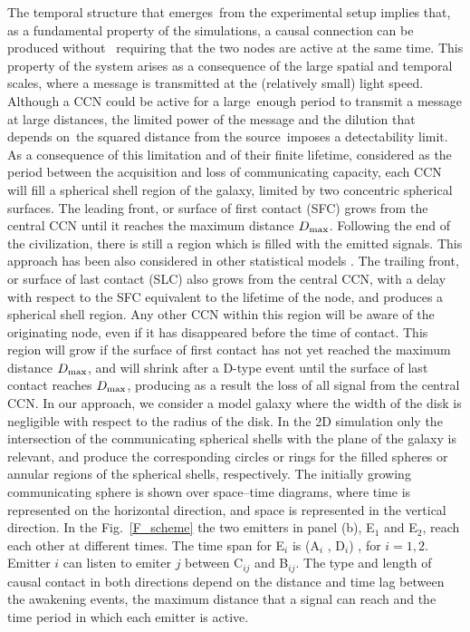 \documentclass[crop]{CSLB}
\newcommand{\ceti}{CCN}
\begin{document}
The temporal structure that emerges from the experimental setup implies that, as a fundamental property of the simulations, a causal connection can be produced without 
requiring that the two nodes are active at the same time.
%
This property of the system arises as a consequence of the large spatial and temporal scales, where a message is transmitted at the (relatively small) light speed.
%
Although a \ceti{} could be active for a large enough period to transmit a message at large distances, the limited power of the message and the dilution that depends on the squared distance from the source imposes a detectability limit.
%
As a consequence of this limitation and of their finite lifetime, considered as the period between the acquisition and loss of communicating capacity, each \ceti{} will fill a spherical shell region of the galaxy, limited by two concentric spherical surfaces.
%
The leading front, or surface of first contact (SFC) grows from the
central \ceti{} until it reaches the maximum distance $D_{\rm max}$.
%
Following the end of the civilization, there is still a region which is filled with the emitted signals.
%
This approach has been also considered in other statistical models \citep[e.g., ][]{smith_broadcasting_2009, grimaldi_signal_2017, Grimaldi2018}.
%
The trailing front, or surface of last contact (SLC) also grows from the central \ceti{}, with a delay with respect to the SFC equivalent to the lifetime of the node, and produces a spherical shell region.
%
Any other \ceti{} within this region will be aware of the originating node, even if it has disappeared before the time of contact.
%
This region will grow if the surface of first contact has not yet
reached the maximum distance $D_{\rm max}$, and will shrink after a
D-type event until the surface of last contact reaches $D_{\rm max}$, producing as a result the loss of all signal from the central \ceti{}.
%
In our approach, we consider a model galaxy where the width of the disk is negligible with respect to the radius of the disk.
%
In the 2D simulation only the intersection of the communicating spherical shells with the plane of the galaxy is relevant, and produce the corresponding circles or rings for the filled spheres or annular regions of the spherical shells, respectively.
%
The initially growing communicating sphere is shown over space--time diagrams, where time is represented on the horizontal direction, and space is represented in the vertical direction.
%
In the Fig.~\ref{F_scheme} the two emitters in panel (b), E$_1$ and E$_2$, reach each other at different times.
%
The time span for E$_i$ is (A$_i$ , D$_i$) , for $i = {1, 2}$.
%
Emitter $i$ can listen to emiter $j$ between C$_{ij}$ and B$_{ij}$.
%
The type and length of causal contact in both directions depend on the distance and time lag between the awakening events, the maximum distance that a signal can reach and the time period in which each emitter is active.
\end{document}
